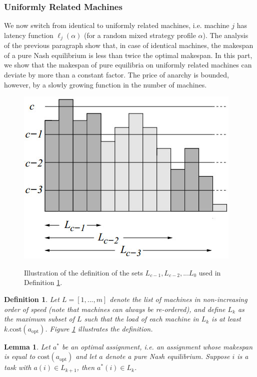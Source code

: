 \documentclass[a4paper,11pt]{article}
\newtheorem{lemma}[theorem]{Lemma}
\newtheorem{definition}[theorem]{Definition}
\newcommand{\cost}{\text{cost}}
\newcommand{\opt}{\text{opt}}
\newcommand{\copt}{\cost(a_{\opt})}
\begin{document}
\subsubsection{Uniformly Related Machines}
We now switch from identical to uniformly related machines, i.e. machine $j$ has latency function $\ell_j(\alpha)$ (for a random mixed strategy profile $\alpha$). The analysis of the previous paragraph show that, in case of identical machines, the makespan of a pure Nash equilibrium is less than twice the optimal makespan. In this part, we show that the makespan of pure equilibria on uniformly related machines can deviate by more than a constant factor. The price of anarchy is bounded, however, by a slowly growing function in the number of machines.


\begin{figure}[t]
  \centering
  \includegraphics[scale=0.5]{lk.jpg}\\
  \caption{Illustration of the definition of the sets $L_{c-1}, L_{c-2},...L_0$ used in Definition \ref{lkdef}.}\label{lk}
\end{figure}

\begin{definition}\cite{4}\label{lkdef}
Let $L = [1,...,m]$ denote the list of machines in non-increasing order of speed (note that machines can always be re-ordered), and define $L_k$ as the maximum subset of $L$ such that the load of each machine in $L_k$ is at least $k.\copt$. Figure \ref{lk} illustrates the definition.
\end{definition}

\begin{lemma}\label{lemmalk}
Let $a^*$ be an optimal assignment, i.e. an assignment whose makespan is equal to $\copt$ and let $a$ denote a pure Nash equilibrium. Suppose $i$ is a task with $a(i) \in L_{k+1}$, then $a^*(i) \in L_k$.
\end{lemma}
\end{document}
